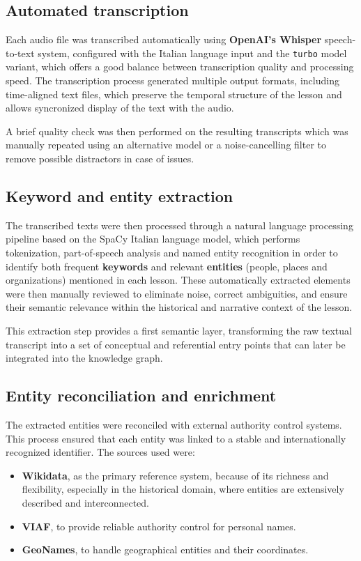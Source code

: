 \documentclass[11pt]{article}
\begin{document}
\subsection{Automated transcription}
Each audio file was transcribed automatically using \textbf{OpenAI’s Whisper} speech-to-text system, configured with the Italian language input and the \texttt{turbo} model variant, which offers a good balance between transcription quality and processing speed. The transcription process generated multiple output formats, including time-aligned text files, which preserve the temporal structure of the lesson and allows syncronized display of the text with the audio.

A brief quality check was then performed on the resulting transcripts which was manually repeated using an alternative model or a noise-cancelling filter to remove possible distractors in case of issues.


\subsection{Keyword and entity extraction}
The transcribed texts were then processed through a natural language processing pipeline based on the SpaCy Italian language model, which performs tokenization, part-of-speech analysis and named entity recognition in order to identify both frequent \textbf{keywords} and relevant \textbf{entities} (people, places and organizations) mentioned in each lesson. These automatically extracted elements were then manually reviewed to eliminate noise, correct ambiguities, and ensure their semantic relevance within the historical and narrative context of the lesson.

This extraction step provides a first semantic layer, transforming the raw textual transcript into a set of conceptual and referential entry points that can later be integrated into the knowledge graph.


\subsection{Entity reconciliation and enrichment}
The extracted entities were reconciled with external authority control systems. This process ensured that each entity was linked to a stable and internationally recognized identifier. The sources used were:

\begin{itemize}
\item \textbf{Wikidata}, as the primary reference system, because of its richness and flexibility, especially in the historical domain, where entities are extensively described and interconnected.
\item \textbf{VIAF}, to provide reliable authority control for personal names.
\item \textbf{GeoNames}, to handle geographical entities and their coordinates.
\end{itemize}
\end{document}
